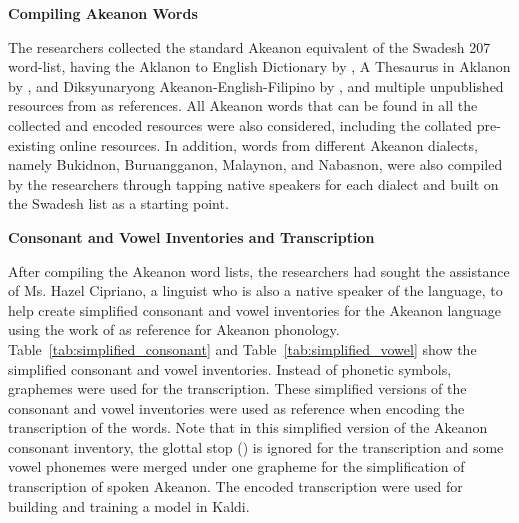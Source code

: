 \textbf{Compiling Akeanon Words}

The researchers collected the standard Akeanon equivalent of the Swadesh 207 word-list, having the Aklanon to English Dictionary by , A Thesaurus in Aklanon by , and Diksyunaryong Akeanon-English-Filipino by , and multiple unpublished resources from  as references. All Akeanon words that can be found in all the collected and encoded resources were also considered, including the collated pre-existing online resources. In addition, words from different Akeanon dialects, namely Bukidnon, Buruangganon, Malaynon, and Nabasnon, were also compiled by the researchers through tapping native speakers for each dialect and built on the Swadesh list as a starting point. 

\textbf{Consonant and Vowel Inventories and Transcription}

After compiling the Akeanon word lists, the researchers had sought the assistance of Ms. Hazel Cipriano, a linguist who is also a native speaker of the language, to help create simplified  consonant and vowel inventories for the Akeanon language using the work of  as reference for Akeanon phonology. Table~\ref{tab:simplified_consonant} and Table~\ref{tab:simplified_vowel} show the simplified consonant and vowel inventories. Instead of phonetic symbols, graphemes were used for the transcription. These simplified versions of the consonant and vowel inventories were used as reference when encoding the transcription of the words. Note that in this simplified version of the Akeanon consonant inventory, the glottal stop () is ignored for the transcription and some vowel phonemes were merged under one grapheme for the simplification of transcription of spoken Akeanon. The encoded transcription were used for building and training a model in Kaldi.

